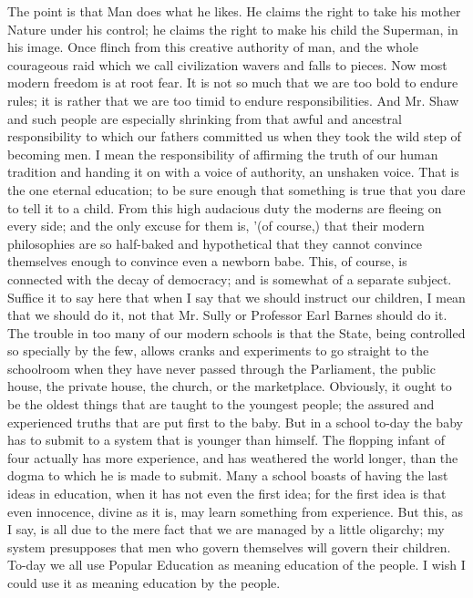 \documentclass{book}
\begin{document}
The point is that Man does what he likes. He claims the right to take his mother Nature under his control; he claims the right to make his child the Superman, in his image. Once flinch from this creative authority of man, and the whole courageous raid which we call civilization wavers and falls to pieces. Now most modern freedom is at root fear. It is not so much that we are too bold to endure rules; it is rather that we are too timid to endure responsibilities. And Mr. Shaw and such people are especially shrinking from that awful and ancestral responsibility to which our fathers committed us when they took the wild step of becoming men. I mean the responsibility of affirming the truth of our human tradition and handing it on with a voice of authority, an unshaken voice. That is the one eternal education; to be sure enough that something is true that you dare to tell it to a child. From this high audacious duty the moderns are fleeing on every side; and the only excuse for them is, ’(of course,) that their modern philosophies are so half-baked and hypothetical that they cannot convince themselves enough to convince even a newborn babe. This, of course, is connected with the decay of democracy; and is somewhat of a separate subject. Suffice it to say here that when I say that we should instruct our children, I mean that we should do it, not that Mr. Sully or Professor Earl Barnes should do it. The trouble in too many of our modern schools is that the State, being controlled so specially by the few, allows cranks and experiments to go straight to the schoolroom when they have never passed through the Parliament, the public house, the private house, the church, or the marketplace. Obviously, it ought to be the oldest things that are taught to the youngest people; the assured and experienced truths that are put first to the baby. But in a school to-day the baby has to submit to a system that is younger than himself. The flopping infant of four actually has more experience, and has weathered the world longer, than the dogma to which he is made to submit. Many a school boasts of having the last ideas in education, when it has not even the first idea; for the first idea is that even innocence, divine as it is, may learn something from experience. But this, as I say, is all due to the mere fact that we are managed by a little oligarchy; my system presupposes that men who govern themselves will govern their children. To-day we all use Popular Education as meaning education of the people. I wish I could use it as meaning education by the people.
\end{document}
